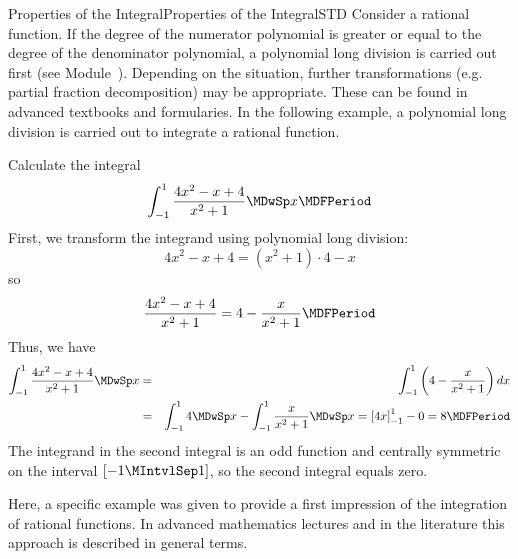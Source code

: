 \begin{MXContent}{Properties of the Integral}{Properties of the Integral}{STD}
Consider a rational function. If the degree of the numerator polynomial is greater 
or equal to the degree of the denominator polynomial, a 
polynomial long division is carried out first (see Module~). Depending on the 
situation, further transformations (e.g. partial fraction decomposition) may be 
appropriate. These can be found in advanced textbooks and formularies. In 
the following example, a polynomial long division is carried out to integrate 
a rational function.

\begin{MExample}
Calculate the integral
\[
\int_{-1}^{1} \frac{4 x^2 - x + 4}{x^2 + 1} \MDwSp x \MDFPeriod%
\]
First, we transform the integrand using polynomial long division:
\[
4 x^2 - x + 4 = (x^2 + 1) \cdot 4 - x %
\]
so
\[
\frac{4 x^2 - x + 4}{x^2 + 1} = 4 - \frac{x}{x^2 + 1} \MDFPeriod %
\]
Thus, we have
\begin{eqnarray*}
\int_{-1}^{1} \frac{4 x^2 - x + 4}{x^2 + 1} \MDwSp x %
& = & 
\int_{-1}^{1} \left(4 - \frac{x}{x^2 + 1}\right) \MD x \\
& = & 
\int_{-1}^{1} 4 \MDwSp x - \int_{-1}^{1} \frac{x}{x^2 + 1} \MDwSp x %
= \left[4 x\right]_{-1}^{1} - 0 %
= 8 \MDFPeriod
\end{eqnarray*}
The integrand in the second integral is an odd function and centrally symmetric on the interval 
$[-1\MIntvlSep 1]$, so the second integral equals zero. 

Here, a specific example was given to provide a first impression of the integration 
of rational functions. In advanced mathematics lectures and in the literature this 
approach is described in general terms.
\end{MExample}

\end{MXContent}


